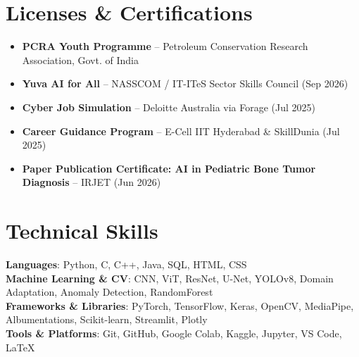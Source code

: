 \documentclass[10pt, a4paper]{article}
\begin{document}
\section{Licenses \& Certifications}
 \begin{itemize}[leftmargin=0.15in, label={\textbullet}]
    \small\item \textbf{PCRA Youth Programme} -- Petroleum Conservation Research Association, Govt. of India
    \small\item \textbf{Yuva AI for All} -- NASSCOM / IT-ITeS Sector Skills Council (Sep 2026)
    \small\item \textbf{Cyber Job Simulation} -- Deloitte Australia via Forage (Jul 2025)
    \small\item \textbf{Career Guidance Program} -- E-Cell IIT Hyderabad \& SkillDunia (Jul 2025)
    \small\item \textbf{Paper Publication Certificate: AI in Pediatric Bone Tumor Diagnosis} -- IRJET (Jun 2026)
 \end{itemize}

\section{Technical Skills}
 \begin{itemize}[leftmargin=0.15in, label={}]
    \small{\item{
     \textbf{Languages}{: Python, C, C++, Java, SQL, HTML, CSS} \\
     \textbf{Machine Learning \& CV}{: CNN, ViT, ResNet, U-Net, YOLOv8, Domain Adaptation, Anomaly Detection, RandomForest} \\
     \textbf{Frameworks \& Libraries}{: PyTorch, TensorFlow, Keras, OpenCV, MediaPipe, Albumentations, Scikit-learn, Streamlit, Plotly} \\
     \textbf{Tools \& Platforms}{: Git, GitHub, Google Colab, Kaggle, Jupyter, VS Code, LaTeX}
    
    }}
 \end{itemize}
\end{document}
